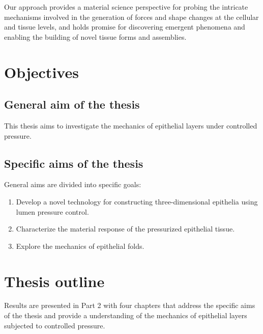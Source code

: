 Our approach provides a material science perspective for probing the intricate mechanisms involved in the generation of forces and shape changes at the cellular and tissue levels, and holds promise for discovering emergent phenomena and enabling the building of novel tissue forms and assemblies.  

\hypertarget{objectives}{%
\section{Objectives}\label{objectives}}

\subsection*{General aim of the thesis} 

This thesis aims to investigate the mechanics of epithelial layers under controlled pressure.  

\subsection*{Specific aims of the thesis} 
General aims are divided into specific goals:

\begin{enumerate}
\def\labelenumi{\arabic{enumi}.}
\item  Develop a novel technology for constructing three-dimensional epithelia using lumen pressure control.  
\item  Characterize the material response of the pressurized epithelial tissue.  
\item  Explore the mechanics of epithelial folds.
\end{enumerate}

\hypertarget{thesis-outline}{%
\section{Thesis outline}\label{thesis-outline}}

Results are presented in Part 2 with four chapters that address the specific aims of the thesis and provide a understanding of the mechanics of epithelial layers subjected to controlled pressure.  

